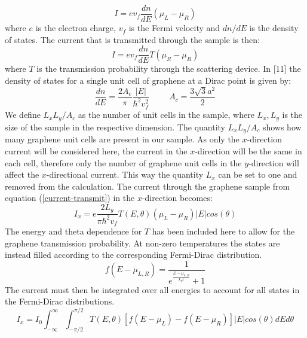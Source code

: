 \documentclass[12pt,a4paper]{article}
\begin{document}
			\begin{equation}
				I=ev_{f}\frac{dn}{dE}\left(\mu_{L}-\mu_{R}\right)
				\label{current-dos}
			\end{equation}
			where $e$ is the electron charge, $v_{f}$ is the Fermi velocity and $dn/dE$ is the density of states. The current that is transmitted through the sample is then:
			\begin{equation}
				I=ev_{f}\frac{dn}{dE}T\left(\mu_{R}-\mu_{R}\right)
				\label{current-transmit}
			\end{equation}
			where $T$ is the transmission probability through the scattering device. In [11] the density of states for a single unit cell of graphene at a Dirac point is given by:
			\begin{equation}
				\frac{dn}{dE}=\frac{2A_{c}}{\pi}\frac{|E|}{\hbar^{2}v_{f}^{2}}
				\hspace{1cm}
				A_{c}=\frac{3\sqrt{3}a^{2}}{2}
			\end{equation}
			We define $L_{x}L_{y}/A_{c}$ as the number of unit cells in the sample, where  $L_{x}, L_{y}$ is the size of the sample in the respective dimension. The quantity $L_{x}L_{y}/A_{c}$ shows how many graphene unit cells are present in our sample. As only the $x$-direction current will be considered here, the current in the $x$-direction will be the same in each cell, therefore only the number of graphene unit cells in the $y$-direction will affect the $x$-directional current. This way the quantity $L_{x}$ can be set to one and removed from the calculation. The current through the graphene sample from equation (\ref{current-transmit}) in the $x$-direction becomes:
			\begin{equation}
				I_{x}=e\frac{2L_{y}}{\pi \hbar^{2}v_{f}}T\left(E,\theta\right)\left(\mu_{L}-\mu_{R}\right)|E|cos\left(\theta\right)
			\end{equation}
			The energy and theta dependence for $T$ has been included here to allow for the graphene transmission probability. At non-zero temperatures the states are instead filled according to the corresponding Fermi-Dirac distribution.
			\begin{equation}
				f\left(E-\mu_{L,R}\right)=\frac{1}{e^{\frac{E-\mu_{L,R}}{k_{b}t}}+1}
			\end{equation}
			The current must then be integrated over all energies to account for all states in the Fermi-Dirac distributions.
			\begin{equation}
				I_{x}=I_{0}\int^{\infty}_{-\infty}\int^{\pi/2}_{-\pi/2}T\left(E,\theta\right)\left[f\left(E-\mu_{L}\right)-f\left(E-\mu_{R}\right)\right]|E|cos\left(\theta\right)dEd\theta
			\end{equation}
\end{document}
